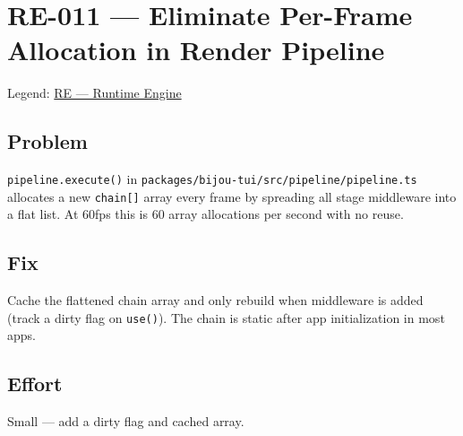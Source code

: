 \chapter{RE-011 --- Eliminate Per-Frame Allocation in Render Pipeline}\label{record-362}

\smallskip

Legend: \href{https://github.com/flyingrobots/bijou/blob/cbd70612140e7a450d764b3c7be1c6af878b99bc/docs/method/graveyard/legends/RE-runtime-engine.md}{RE --- Runtime Engine}

\section{Problem}\label{record-362-problem}

\texttt{p\allowbreak{}i\allowbreak{}p\allowbreak{}e\allowbreak{}l\allowbreak{}i\allowbreak{}n\allowbreak{}e\allowbreak{}.\allowbreak{}e\allowbreak{}x\allowbreak{}e\allowbreak{}c\allowbreak{}u\allowbreak{}t\allowbreak{}e\allowbreak{}(\allowbreak{})} in \texttt{p\allowbreak{}a\allowbreak{}c\allowbreak{}k\allowbreak{}a\allowbreak{}g\allowbreak{}e\allowbreak{}s\allowbreak{}/\allowbreak{}b\allowbreak{}i\allowbreak{}j\allowbreak{}o\allowbreak{}u\allowbreak{}-\allowbreak{}t\allowbreak{}u\allowbreak{}i\allowbreak{}/\allowbreak{}s\allowbreak{}r\allowbreak{}c\allowbreak{}/\allowbreak{}p\allowbreak{}i\allowbreak{}p\allowbreak{}e\allowbreak{}l\allowbreak{}i\allowbreak{}n\allowbreak{}e\allowbreak{}/\allowbreak{}p\allowbreak{}i\allowbreak{}p\allowbreak{}e\allowbreak{}l\allowbreak{}i\allowbreak{}n\allowbreak{}e\allowbreak{}.\allowbreak{}t\allowbreak{}s} allocates a new \texttt{c\allowbreak{}h\allowbreak{}a\allowbreak{}i\allowbreak{}n\allowbreak{}[\allowbreak{}]} array every frame by spreading all stage middleware into a flat list. At 60fps this is 60 array allocations per second with no reuse.

\section{Fix}\label{record-362-fix}

Cache the flattened chain array and only rebuild when middleware is added (track a dirty flag on \texttt{u\allowbreak{}s\allowbreak{}e\allowbreak{}(\allowbreak{})}). The chain is static after app initialization in most apps.

\section{Effort}\label{record-362-effort}

Small --- add a dirty flag and cached array.

